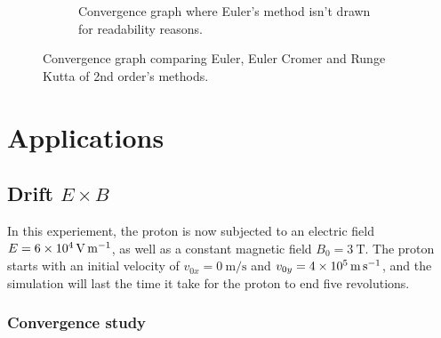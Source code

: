 \documentclass[a4paper,12pt,twoside]{article}
\begin{document}
\begin{figure}[h]
\begin{subfigure}[t]{0.45\textwidth}
	\vfill
	\caption{Convergence graph where Euler's method isn't drawn for readability reasons.}
	\label{fig:app1-conv-noEuler}
\end{subfigure}
\caption{Convergence graph comparing Euler, Euler Cromer and Runge Kutta of 2nd order's methods.}
\label{fig:app1-conv}
\end{figure}




\section{Applications}
\subsection{Drift $E\times B$}
In this experiement, the proton is now subjected to an electric field $E=\SI{6d4}{\volt\per\meter}$, as well as a constant magnetic field $B_0 = \SI{3}{\tesla}$.
The proton starts with an initial velocity of $v_{0x}=\SI{0}{\meter\per\second}$ and $v_{0y}=\SI{4d5}{\meter\per\second}$, and the simulation will last the time it take for the proton to end five revolutions.
\subsubsection{Convergence study}%
\end{document}
